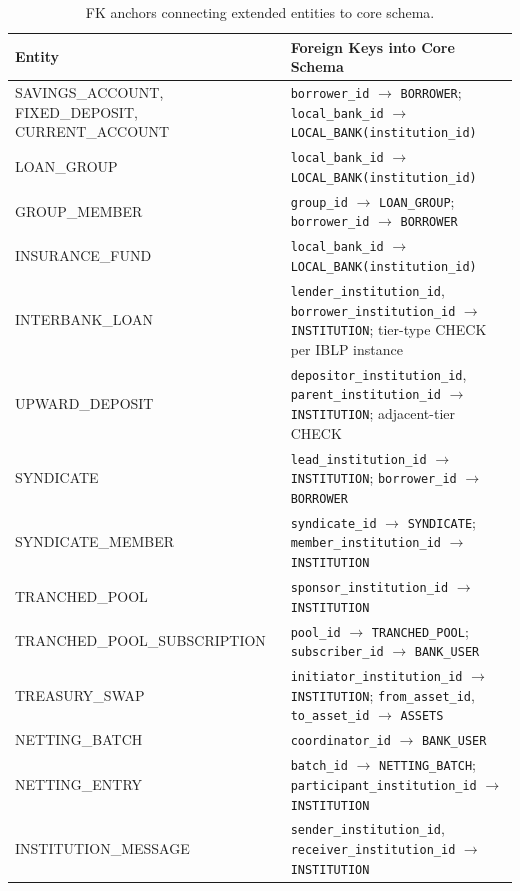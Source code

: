 \documentclass[12pt,a4paper]{report}
\newcommand{\tableheadcolor}{\rowcolor{TableHeadBg}}
\begin{document}
\begin{table}[H]
\centering
\caption[FK anchors for extended and multi-entity entities]{FK anchors connecting extended entities to core schema.}
\label{tab:ext-entity-fks}
\small
\begin{tabular}{@{}p{3.5cm}p{8.5cm}@{}}
\toprule
\tableheadcolor
\textbf{Entity} & \textbf{Foreign Keys into Core Schema} \\
\midrule
SAVINGS\_ACCOUNT, FIXED\_DEPOSIT, CURRENT\_ACCOUNT & \texttt{borrower\_id} $\to$ \texttt{BORROWER}; \texttt{local\_bank\_id} $\to$ \texttt{LOCAL\_BANK(institution\_id)} \\
LOAN\_GROUP & \texttt{local\_bank\_id} $\to$ \texttt{LOCAL\_BANK(institution\_id)} \\
GROUP\_MEMBER & \texttt{group\_id} $\to$ \texttt{LOAN\_GROUP}; \texttt{borrower\_id} $\to$ \texttt{BORROWER} \\
INSURANCE\_FUND & \texttt{local\_bank\_id} $\to$ \texttt{LOCAL\_BANK(institution\_id)} \\
INTERBANK\_LOAN & \texttt{lender\_institution\_id}, \texttt{borrower\_institution\_id} $\to$ \texttt{INSTITUTION}; tier-type CHECK per IBLP instance \\
UPWARD\_DEPOSIT & \texttt{depositor\_institution\_id}, \texttt{parent\_institution\_id} $\to$ \texttt{INSTITUTION}; adjacent-tier CHECK \\
SYNDICATE & \texttt{lead\_institution\_id} $\to$ \texttt{INSTITUTION}; \texttt{borrower\_id} $\to$ \texttt{BORROWER} \\
SYNDICATE\_MEMBER & \texttt{syndicate\_id} $\to$ \texttt{SYNDICATE}; \texttt{member\_institution\_id} $\to$ \texttt{INSTITUTION} \\
TRANCHED\_POOL & \texttt{sponsor\_institution\_id} $\to$ \texttt{INSTITUTION} \\
TRANCHED\_POOL\_SUBSCRIPTION & \texttt{pool\_id} $\to$ \texttt{TRANCHED\_POOL}; \texttt{subscriber\_id} $\to$ \texttt{BANK\_USER} \\
TREASURY\_SWAP & \texttt{initiator\_institution\_id} $\to$ \texttt{INSTITUTION}; \texttt{from\_asset\_id}, \texttt{to\_asset\_id} $\to$ \texttt{ASSETS} \\
NETTING\_BATCH & \texttt{coordinator\_id} $\to$ \texttt{BANK\_USER} \\
NETTING\_ENTRY & \texttt{batch\_id} $\to$ \texttt{NETTING\_BATCH}; \texttt{participant\_institution\_id} $\to$ \texttt{INSTITUTION} \\
INSTITUTION\_MESSAGE & \texttt{sender\_institution\_id}, \texttt{receiver\_institution\_id} $\to$ \texttt{INSTITUTION} \\

\end{tabular}
\end{table}
\end{document}
